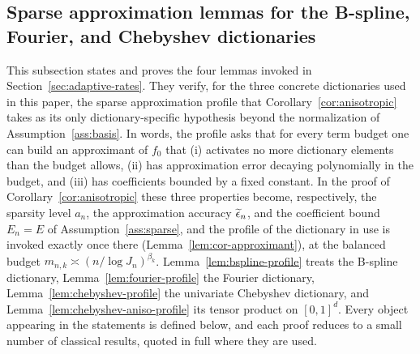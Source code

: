 \subsection*{Sparse approximation lemmas for the B-spline,\\ Fourier, and Chebyshev dictionaries}

This subsection states and proves the four lemmas invoked in Section~\ref{sec:adaptive-rates}. They verify, for the three concrete dictionaries used in this paper, the sparse approximation profile that Corollary~\ref{cor:anisotropic} takes as its only dictionary-specific hypothesis beyond the normalization of Assumption~\ref{ass:basis}. In words, the profile asks that for every term budget one can build an approximant of $f_0$ that (i) activates no more dictionary elements than the budget allows, (ii) has approximation error decaying polynomially in the budget, and (iii) has coefficients bounded by a fixed constant. In the proof of Corollary~\ref{cor:anisotropic} these three properties become, respectively, the sparsity level $a_n$, the approximation accuracy $\widetilde{\epsilon}_n$, and the coefficient bound $E_n=E$ of Assumption~\ref{ass:sparse}, and the profile of the dictionary in use is invoked exactly once there (Lemma~\ref{lem:cor-approximant}), at the balanced budget $m_{n,k}\asymp(n/\log J_n)^{\beta_k}$. Lemma~\ref{lem:bspline-profile} treats the B-spline dictionary, Lemma~\ref{lem:fourier-profile} the Fourier dictionary, Lemma~\ref{lem:chebyshev-profile} the univariate Chebyshev dictionary, and Lemma~\ref{lem:chebyshev-aniso-profile} its tensor product on $[0,1]^d$. Every object appearing in the statements is defined below, and each proof reduces to a small number of classical results, quoted in full where they are used.

